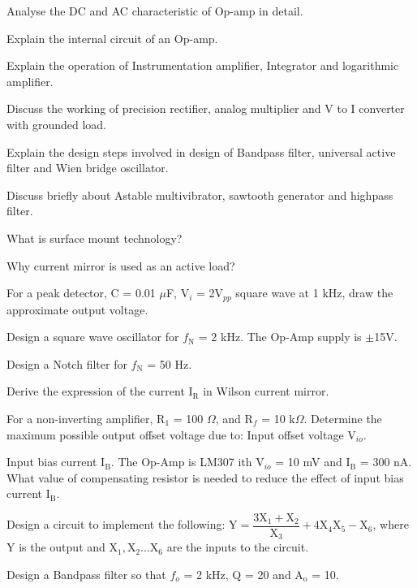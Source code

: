 \newpage \again

\item Analyse the DC and AC characteristic of Op-amp in detail.
\Or
\item Explain the internal circuit of an Op-amp.

\item Explain the operation of Instrumentation amplifier, Integrator
 and logarithmic amplifier.
\Or
\item Discuss the working of precision rectifier, analog multiplier and
  V to I converter with grounded load.

\item Explain the design steps involved in design of Bandpass filter,
  universal active filter and Wien bridge oscillator.
\Or
\item Discuss briefly about Astable multivibrator, sawtooth generator
  and highpass filter.

\markC
\ene

\newpage

\sub{\subj}
\maxtime

\partA

\iitem What is surface mount technology?
\item Why current mirror is used as an active load?
\item For a peak detector, C = 0.01 $\mu$F, V$_i$ = 2V$_{pp}$ square wave at 1 kHz, draw the approximate
  output voltage.
\item Design a square wave oscillator for $f_\text{N}$ = 2 kHz. The Op-Amp supply is $\pm$15V.
\item Design a Notch filter for $f_{\text{N}}$ = 50 Hz.

\markA
\partB

\item Derive the expression of the current $\text{I}_{\text{R}}$ in Wilson current mirror.
\item For a non-inverting amplifier, $\text{R}_1$ = 100 $\Omega$, and R$_f$ = 10 k$\Omega$.
  Determine the maximum possible output offset voltage due to:
  \iitem Input offset voltage V$_{io}.$ \item Input bias current I$_{\text{B}}$.
    \ene
    The Op-Amp is LM307 ith V$_{io}$ = 10 mV and I$_\text{B}$ = 300 nA. What value of compensating
    resistor is needed to reduce the effect of input bias current I$_\text{B}$.
\item Design a circuit to implement the following: $\text{Y} = \dfrac{3\text{X}_1 +
  \text{X}_2}{\text{X}_3} + 4 \text{X}_4\text{X}_5 - \text{X}_6$, where Y is the output
  and $\text{X}_1, \text{X}_2 \dots \text{X}_6$ are the inputs to the circuit.
\item Design a Bandpass filter so that $f_o$ = 2 kHz, Q = 20 and A$_\text{o}$ = 10.

